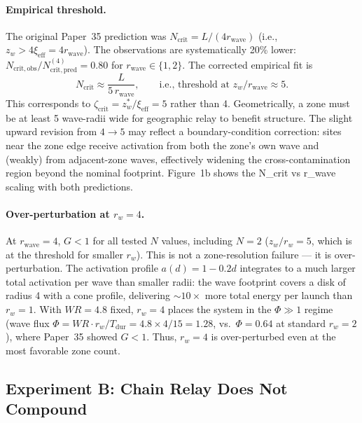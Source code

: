 \documentclass[11pt]{article}
\begin{document}
\paragraph{Empirical threshold.}
The original Paper~35 prediction was $N_\mathrm{crit} = L/(4r_\mathrm{wave})$
(i.e., $z_w > 4\xi_\mathrm{eff} = 4r_\mathrm{wave}$).
The observations are systematically 20\% lower:
$N_\mathrm{crit,obs}/N_\mathrm{crit,pred}^{(4)} = 0.80$ for $r_\mathrm{wave} \in \{1,2\}$.
The corrected empirical fit is
\begin{equation}
  \boxed{N_\mathrm{crit} \approx \frac{L}{5\, r_\mathrm{wave}}},
  \qquad \text{i.e., threshold at } z_w / r_\mathrm{wave} \approx 5.
\end{equation}
This corresponds to $\zeta_\mathrm{crit} = z_w^*/\xi_\mathrm{eff} = 5$
rather than 4.
Geometrically, a zone must be at least 5 wave-radii wide for geographic
relay to benefit structure. The slight upward revision from $4\to 5$ may
reflect a boundary-condition correction: sites near the zone edge receive
activation from both the zone's own wave and (weakly) from adjacent-zone waves,
effectively widening the cross-contamination region beyond the nominal footprint.
Figure~1b shows the N_crit vs r_wave scaling with both predictions.

\paragraph{Over-perturbation at $r_w = 4$.}
At $r_\mathrm{wave}=4$, $G < 1$ for all tested $N$ values, including $N=2$
($z_w/r_w = 5$, which is at the threshold for smaller $r_w$).
This is not a zone-resolution failure --- it is over-perturbation.
The activation profile $a(d) = 1 - 0.2d$ integrates to a much larger total
activation per wave than smaller radii: the wave footprint covers a disk of
radius 4 with a cone profile, delivering $\sim\!10\times$ more total energy
per launch than $r_w=1$.
With $WR=4.8$ fixed, $r_w=4$ places the system in the $\Phi \gg 1$ regime
(wave flux $\Phi = WR \cdot r_w / T_\mathrm{dur} = 4.8\times 4/15 = 1.28$,
vs.\ $\Phi=0.64$ at standard $r_w=2$), where Paper~35 showed $G < 1$.
Thus, $r_w=4$ is over-perturbed even at the most favorable zone count.

\subsection{Experiment B: Chain Relay Does Not Compound}
\end{document}
